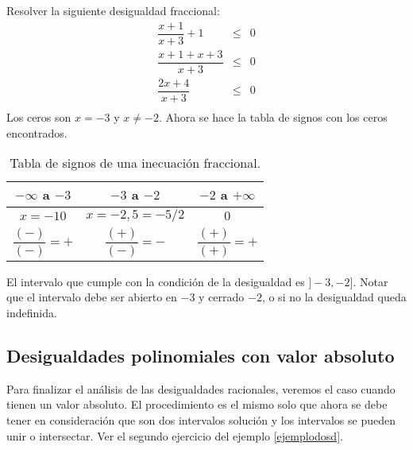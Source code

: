 \begin{myexample}
Resolver la siguiente desigualdad fraccional:\\
\begin{eqnarray}
\dfrac{x+1}{x+3}+1&\leq &0 \\
\dfrac{x+1+x+3}{x+3} &\leq &0 \\
\dfrac{2x+4}{x+3}& \leq & 0 \\
\end{eqnarray} 
Los ceros son $x=-3$ y $x\neq -2$. Ahora se hace la tabla de signos con los ceros encontrados.\\
\begin{center}
\begin{table}[h!]
\centering
\begin{tabular}{|c|c|c|}
\hline
$-\infty$ a $-3$&$-3$ a $-2$& $-2$ a $+\infty$ \\
\hline
$x=-10$&$x=-2,5=-5/2$&$0$ \\
$\dfrac{(-)}{(-)}=+$&$\dfrac{(+)}{(-)}=-$&$\dfrac{(+)}{(+)}=+$ \\
\hline 
\end{tabular}
\caption[Tabla de signos de una inecuación fraccional.]{Tabla de signos de una inecuación fraccional.}
\end{table}
\end{center}
El intervalo que cumple con la condición de la desigualdad es $]-3,-2]$. Notar que el intervalo debe ser abierto en $-3$ y cerrado $-2$, o si no la desigualdad queda indefinida.
\end{myexample}

\subsection{Desigualdades polinomiales con valor absoluto}
Para finalizar el análisis de las desigualdades racionales, veremos el caso cuando tienen un valor absoluto. El procedimiento es el mismo solo que ahora se debe tener en consideración que son dos intervalos solución y los intervalos se pueden unir o intersectar. Ver el segundo ejercicio del ejemplo \ref{ejemplodosd}.

